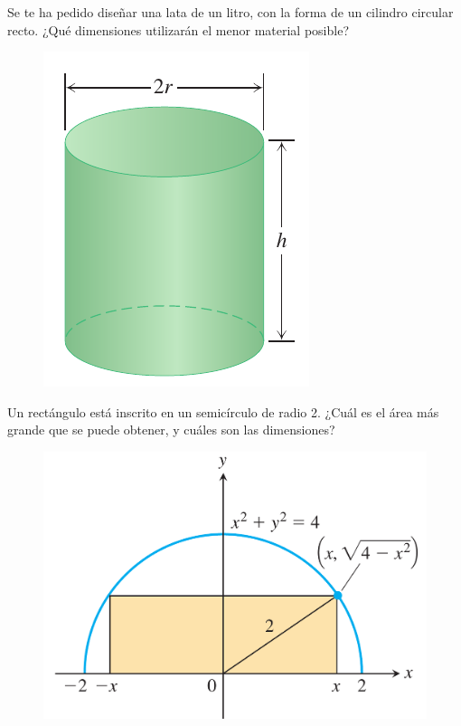 	
	Se te ha pedido diseñar una lata de un litro, con la forma de un cilindro circular recto. ¿Qué dimensiones utilizarán el menor material posible?



	
	\begin{figure}
		\centering
		\includegraphics[height=0.7\textheight]{./calculo/thomas_04_38}
		\label{fig:thomas0438}
	\end{figure}
	



	Un rectángulo está inscrito en un semicírculo de radio 2. ¿Cuál es el área más grande que se puede obtener, y cuáles son las dimensiones?
	



	\begin{figure}
		\centering
		\includegraphics[height=.7\textheight]{./calculo/thomas_04_40}
		\caption{}
		\label{fig:thomas0440}
	\end{figure}
	


